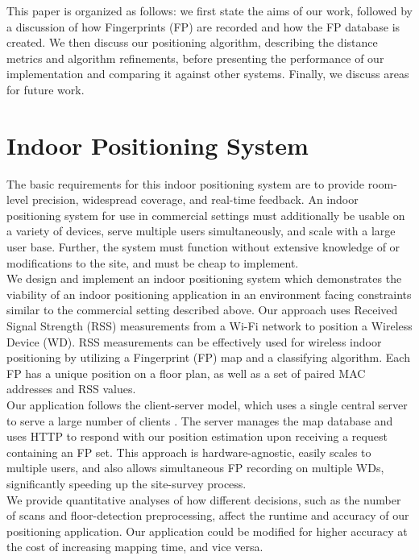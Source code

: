 \documentclass[conference]{IEEEtran}
\begin{document}
\indent This paper is organized as follows: we first state the aims of our work, followed by a discussion of how Fingerprints (FP) are recorded and how the FP database is created. We then discuss our positioning algorithm, describing the distance metrics and algorithm refinements, before presenting the performance of our implementation and comparing it against other systems. Finally, we discuss areas for future work.

\section{Indoor Positioning System}
The basic requirements for this indoor positioning system are to provide room-level precision, widespread coverage, and real-time feedback. An indoor positioning system for use in commercial settings must additionally be usable on a variety of devices, serve multiple users simultaneously, and scale with a large user base. Further, the system must function without extensive knowledge of or modifications to the site, and must be cheap to implement. \\
\indent We design and implement an indoor positioning system which demonstrates the viability of an indoor positioning application in an environment facing constraints similar to the commercial setting described above. Our approach uses Received Signal Strength (RSS) measurements from a Wi-Fi network to position a Wireless Device (WD). RSS measurements can be effectively used for wireless indoor positioning by utilizing a Fingerprint (FP) map and a classifying algorithm. Each FP has a unique position on a floor plan, as well as a set of paired MAC addresses and RSS values.\\
\indent Our application follows the client-server model, which uses a single central server to serve a large number of clients \cite{Fielding}. The server manages the map database and uses HTTP to respond with our position estimation upon receiving a request containing an FP set. This approach is hardware-agnostic, easily scales to multiple users, and also allows simultaneous FP recording on multiple WDs, significantly speeding up the site-survey process.\\ 
\indent We provide quantitative analyses of how different decisions, such as the number of scans and floor-detection preprocessing, affect the runtime and accuracy of our positioning application. Our application could be modified for higher accuracy at the cost of increasing mapping time, and vice versa.
\end{document}
